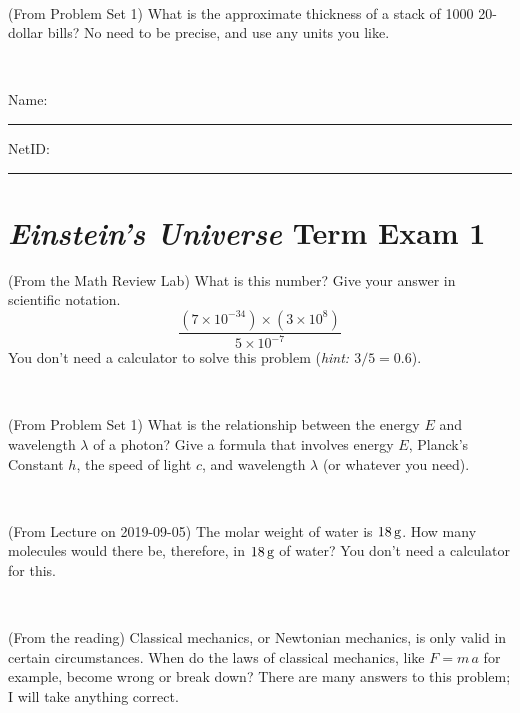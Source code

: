 \documentclass[12pt, letterpaper]{article}
\begin{document}
\vfill ~

\begin{problem} (From Problem Set 1)
What is the approximate thickness of a stack of 1000 20-dollar bills?
No need to be precise, and use any units you like.
\end{problem}


\vfill ~


\cleardoublepage



\noindent
Name: \rule[-1ex]{0.60\textwidth}{0.1pt}
NetID: \rule[-1ex]{0.20\textwidth}{0.1pt}

\section*{\textsl{Einstein's Universe} Term Exam 1}
\setcounter{problem}{1}


\begin{problem} (From the Math Review Lab)
What is this number? Give your answer in scientific notation.
$$
\frac{(7\times10^{-34})\times(3\times10^8)}{5\times10^{-7}}
$$
You don't need a calculator to solve this problem (\textit{hint: $3/5=0.6$}).
\end{problem}


\vfill ~

\begin{problem} (From Problem Set 1)
What is the relationship between the energy $E$ and wavelength
$\lambda$ of a photon? Give a formula that involves energy $E$,
Planck's Constant $h$, the speed of light $c$, and wavelength
$\lambda$ (or whatever you need).
\end{problem}

\vfill ~

\begin{problem} (From Lecture on 2019-09-05)
The molar weight of water is $18\,\mathrm{g}$. How many molecules would there
be, therefore, in $18\,\mathrm{g}$ of water? You don't need a calculator for
this.
\end{problem}


\vfill ~

\begin{problem} (From the reading)
Classical mechanics, or Newtonian mechanics, is only valid in certain
circumstances. When do the laws of classical mechanics, like $F =
m\,a$ for example, become wrong or break down? There are many answers
to this problem; I will take anything correct.
\end{problem}


\vfill ~
\end{document}

